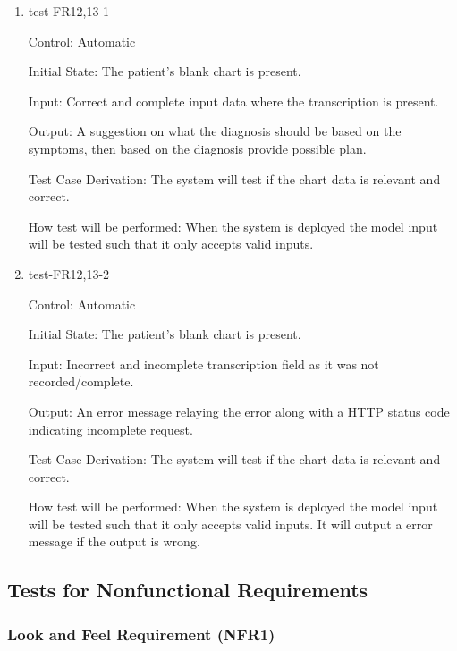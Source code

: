 \documentclass[12pt, titlepage]{article}
\begin{document}
\begin{enumerate}

\item{test-FR12,13-1} \label{test-FR12,13-1}

Control: Automatic

Initial State: The patient's blank chart is present.

Input: Correct and complete input data where the transcription is present.

Output: A suggestion on what the diagnosis should be based on the symptoms, then based on the diagnosis provide possible plan.

Test Case Derivation: The system will test if the chart data is relevant and correct.  

How test will be performed: When the system is deployed the model input will be tested such that it only accepts valid inputs.

\item{test-FR12,13-2} \label{test-FR12,13-2}

Control: Automatic

Initial State: The patient's blank chart is present.

Input: Incorrect and incomplete transcription field as it was not recorded/complete.

Output: An error message relaying the error along with a HTTP status code indicating incomplete request.

Test Case Derivation: The system will test if the chart data is relevant and correct.  

How test will be performed: When the system is deployed the model input will be tested such that it only accepts valid inputs. It will output a error message if the output is wrong.

\end{enumerate}


\subsection{Tests for Nonfunctional Requirements} \label{section:4.2}

\subsubsection{Look and Feel Requirement (NFR1)} \label{section:4.2.1}
\end{document}
